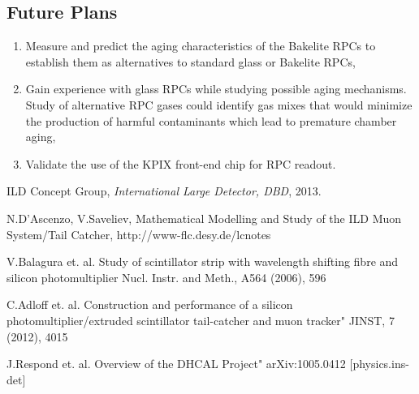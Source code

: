 \documentclass[12pt,twoside,a4paper]{book}
\begin{document}
\subsection{Future Plans}
\begin{enumerate}
\item Measure and predict the aging characteristics of the Bakelite RPCs to establish them as alternatives to standard glass or Bakelite RPCs,
\item Gain experience with glass RPCs while studying possible aging mechanisms. Study of alternative RPC gases could identify gas mixes that would minimize the production of harmful contaminants which lead to premature chamber aging,
\item Validate the use of the KPIX front-end chip for RPC readout.
\end{enumerate}

\begin{thebibliography}{99}

     \newblock ILD Concept Group,
     \newblock \emph{International Large Detector, DBD},
     2013.

    \newblock N.D'Ascenzo, V.Saveliev,
    \newblock Mathematical Modelling and Study of the ILD Muon System/Tail Catcher,
    \newblock http://www-flc.desy.de/lcnotes

    \newblock V.Balagura et. al.
    \newblock Study of scintillator strip with wavelength shifting fibre and silicon photomultiplier
    \newblock Nucl. Instr. and Meth., A564 (2006), 596


    \newblock C.Adloff et. al.
    \newblock Construction and performance of a silicon photomultiplier/extruded scintillator tail-catcher and muon tracker"
    \newblock JINST, 7 (2012), 4015

    \newblock J.Respond et. al.
    \newblock  Overview of the DHCAL Project"
    \newblock  arXiv:1005.0412 [physics.ins-det]


\end{thebibliography}
\end{document}
